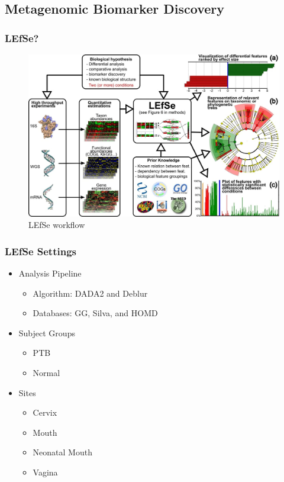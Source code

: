 \documentclass{beamer}
\begin{document}
    \subsection{Metagenomic Biomarker Discovery}
    \begin{frame}
        \frametitle{LEfSe?}

        \begin{figure}
            \includegraphics[width=0.6 \linewidth]{figures/LEfSe.jpg}
            \caption{LEfSe workflow \protect\cite{lefse1}}
        \end{figure}
    \end{frame}

    \begin{frame}
        \frametitle{LEfSe Settings}

        \begin{itemize}
            \item Analysis Pipeline
            \begin{itemize}
                \item Algorithm: DADA2 and Deblur
                \item Databases: GG, Silva, and HOMD
            \end{itemize}
            \item Subject Groups
            \begin{itemize}
                \item PTB
                \item Normal
            \end{itemize}
            \item Sites
            \begin{itemize}
                \item Cervix
                \item Mouth
                \item Neonatal Mouth
                \item Vagina
            \end{itemize}
        \end{itemize}
    \end{frame}
\end{document}
